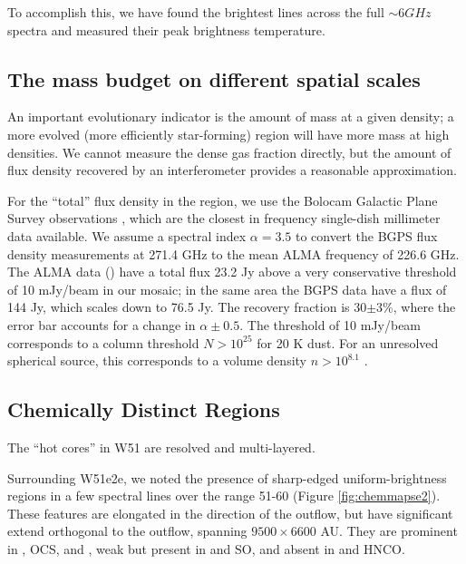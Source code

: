 \documentclass{aa}
\begin{document}
To accomplish this, we have found the brightest lines across the full $\sim6
GHz$ spectra and measured their peak brightness temperature.


\subsection{The mass budget on different spatial scales}
\label{sec:massbudget}
An important evolutionary indicator is the amount of mass at a given density; a
more evolved (more efficiently star-forming) region will have more mass at high
densities.  We cannot measure the dense gas fraction directly, but the amount of
flux density recovered by an interferometer provides a reasonable approximation.

For the ``total'' flux density in the region, we use the Bolocam Galactic Plane
Survey observations \citep{Aguirre2011a,Ginsburg2013a}, which are the closest
in frequency single-dish millimeter data available.  We assume a spectral index
$\alpha=3.5$ to convert the BGPS flux density measurements at 271.4 GHz to the
mean ALMA frequency of 226.6 GHz.  The ALMA data () have a total flux 23.2 Jy above a very conservative
threshold of 10 mJy/beam in our
mosaic; in the same area the BGPS data have a flux of 144 Jy, which scales down to
76.5 Jy.  The recovery fraction is 30$\pm3$\%, where the error bar accounts
for a change in $\alpha\pm0.5$.  The threshold of 10 mJy/beam corresponds to
a column threshold $N>10^{25}$ \percc for 20 K dust.  For an unresolved spherical source,
this corresponds to a volume density $n>10^{8.1}$ \percc.


\subsection{Chemically Distinct Regions}
\label{sec:chemistrymaps}
The ``hot cores'' in W51 are resolved and multi-layered.

Surrounding W51e2e, we noted the presence of sharp-edged uniform-brightness
regions in a few spectral lines over the range 51-60 \kms (Figure
\ref{fig:chemmapse2}).  These features are elongated in the direction of the
outflow, but have significant extend orthogonal to the outflow, spanning
$9500\times6600$ AU.  They are prominent in \methanol, OCS, and \dimethylether, weak
but present in \formaldehyde and SO, and absent in \cyanoacetylene and HNCO.
\end{document}
